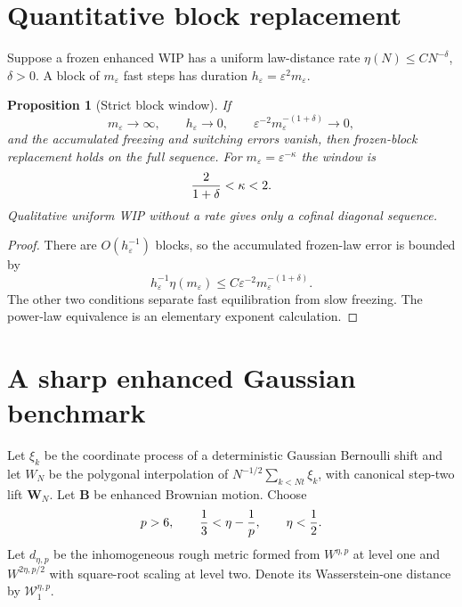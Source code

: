 \documentclass[11pt,reqno]{amsart}
\newtheorem{proposition}[theorem]{Proposition}
\theoremstyle{definition}
\theoremstyle{remark}
\begin{document}
\section{Quantitative block replacement}

Suppose a frozen enhanced WIP has a uniform law-distance rate
$\eta(N)\le CN^{-\delta}$, $\delta>0$.  A block of $m_\varepsilon$ fast steps
has duration $h_\varepsilon=\varepsilon^2m_\varepsilon$.

\begin{proposition}[Strict block window]\label{prop:block}
If
\[
 m_\varepsilon\to\infty,\qquad h_\varepsilon\to0,\qquad
 \varepsilon^{-2}m_\varepsilon^{-(1+\delta)}\to0,
\]
and the accumulated freezing and switching errors vanish, then frozen-block
replacement holds on the full sequence.  For
$m_\varepsilon=\varepsilon^{-\kappa}$ the window is
\begin{equation}\label{eq:kappa}
 {2\over1+\delta}<\kappa<2.
\end{equation}
Qualitative uniform WIP without a rate gives only a cofinal diagonal sequence.
\end{proposition}

\begin{proof}
There are $O(h_\varepsilon^{-1})$ blocks, so the accumulated frozen-law error
is bounded by
\[
 h_\varepsilon^{-1}\eta(m_\varepsilon)
 \le C\varepsilon^{-2}m_\varepsilon^{-(1+\delta)}.
\]
The other two conditions separate fast equilibration from slow freezing.  The
power-law equivalence is an elementary exponent calculation.
\end{proof}

\section{A sharp enhanced Gaussian benchmark}

Let $\xi_k$ be the coordinate process of a deterministic Gaussian Bernoulli
shift and let $W_N$ be the polygonal interpolation of
$N^{-1/2}\sum_{k<Nt}\xi_k$, with canonical step-two lift $\mathbf W_N$.
Let $\mathbf B$ be enhanced Brownian motion.  Choose
\begin{equation}\label{eq:window}
 p>6,\qquad {1\over3}<\eta-{1\over p},\qquad \eta<{1\over2}.
\end{equation}
Let $d_{\eta,p}$ be the inhomogeneous rough metric formed from
$W^{\eta,p}$ at level one and $W^{2\eta,p/2}$ with square-root scaling at
level two.  Denote its Wasserstein-one distance by
$\mathcal W_1^{\eta,p}$.
\end{document}
